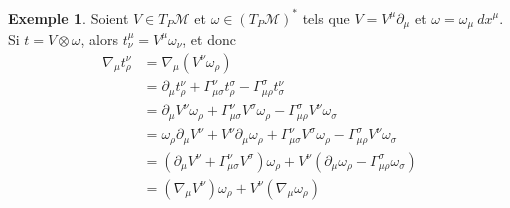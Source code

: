 \documentclass[a4paper,11pt]{report}
\theoremstyle{definition}
\theoremstyle{plain}
\theoremstyle{definition}
\newtheorem{exmp}{Exemple}[chapter]
\theoremstyle{remark}
\newcommand{\M}{\mathscr{M}}
\newcommand{\p}{\partial}
\begin{document}
                \begin{exmp}
                    Soient $V\in T_P\M$ et $\omega\in (T_P\M)^*$ tels que $V = V^\mu\p_\mu$ et $\omega = \omega_\mu~dx^\mu$. Si $t = V\otimes\omega$, alors $t^\mu_\nu = V^\mu\omega_\nu$, et donc
                    \begin{align}
                        \nabla_\mu t^\nu_\rho &= \nabla_\mu(V^\nu\omega_\rho)\\
                        &= \p_\mu t^\nu_\rho + \Gamma^\nu_{\mu\sigma}t^\sigma_\rho - \Gamma^\sigma_{\mu\rho} t^\nu_{\sigma}\\
                        &= \p_\mu V^\nu\omega_\rho + \Gamma^\nu_{\mu\sigma}V^\sigma\omega_\rho - \Gamma^\sigma_{\mu\rho} V^\nu\omega_\sigma\\
                        &= \omega_\rho\p_\mu V^\nu + V^\nu\p_\mu \omega_\rho + \Gamma^\nu_{\mu\sigma}V^\sigma\omega_\rho - \Gamma^\sigma_{\mu\rho} V^\nu\omega_\sigma\\
                        &= \left( \p_\mu V^\nu + \Gamma^\nu_{\mu\sigma}V^\sigma \right)\omega_\rho + V^\nu\left( \p_\mu \omega_\rho - \Gamma^\sigma_{\mu\rho}\omega_\sigma \right)\\
                        &= (\nabla_\mu V^\nu)\omega_\rho + V^\nu(\nabla_\mu\omega_\rho)
                    \end{align}
                \end{exmp}
                
\end{document}

